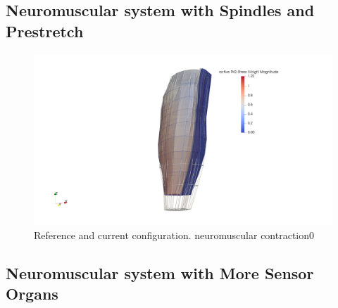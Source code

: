 \subsection{Neuromuscular system with Spindles and Prestretch}


%

\begin{figure}
  \centering%
  \includegraphics[width=\textwidth]{images/results/application/neuromuscular_contraction0.png}%
  \caption{Reference and current configuration. neuromuscular contraction0}%
  \label{fig:neuromuscular_contraction0}%
\end{figure}

\subsection{Neuromuscular system with More Sensor Organs}\label{sec:application_neuromuscular_system_more}

%
%
